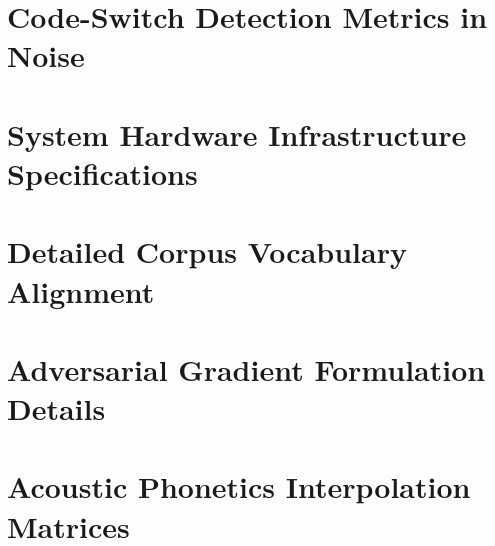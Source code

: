 \documentclass[10pt,conference]{IEEEtran}
\begin{document}
\section{Code-Switch Detection Metrics in Noise}
\lipsum[8-10]

\section{System Hardware Infrastructure Specifications}
\lipsum[11-14]

\section{Detailed Corpus Vocabulary Alignment}
\lipsum[15-20]

\section{Adversarial Gradient Formulation Details}
\lipsum[21-25]

\section{Acoustic Phonetics Interpolation Matrices}
\lipsum[26-30]
\end{document}
